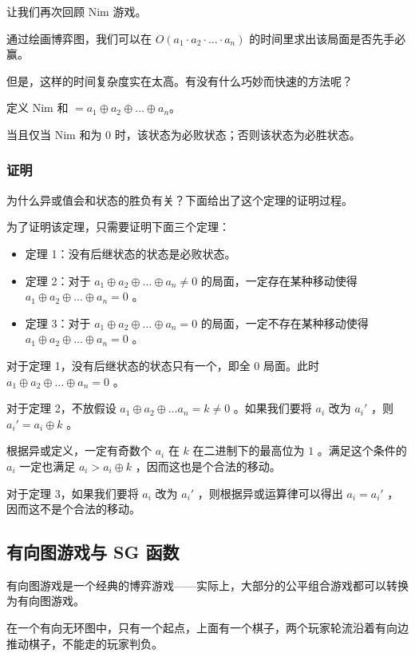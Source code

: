 让我们再次回顾 Nim 游戏。

通过绘画博弈图，我们可以在 $O(a_1 \cdot a_2 \cdot \ldots \cdot a_n)$ 的时间里求出该局面是否先手必赢。

但是，这样的时间复杂度实在太高。有没有什么巧妙而快速的方法呢？

定义 Nim 和 $=a_1 \oplus a_2 \oplus \ldots \oplus a_n$。

当且仅当 Nim 和为 $0$ 时，该状态为必败状态；否则该状态为必胜状态。

\subsubsection{证明}

为什么异或值会和状态的胜负有关？下面给出了这个定理的证明过程。

为了证明该定理，只需要证明下面三个定理：

\begin{itemize}
\item 定理 1：没有后继状态的状态是必败状态。
\item 定理 2：对于 $a_1 \oplus a_2 \oplus \ldots \oplus a_n \neq 0$ 的局面，一定存在某种移动使得 $a_1 \oplus a_2 \oplus \ldots \oplus a_n = 0$ 。
\item 定理 3：对于 $a_1 \oplus a_2 \oplus \ldots \oplus a_n = 0$ 的局面，一定不存在某种移动使得 $a_1 \oplus a_2 \oplus \ldots \oplus a_n = 0$ 。
\end{itemize}

对于定理 1，没有后继状态的状态只有一个，即全 $0$ 局面。此时 $a_1 \oplus a_2 \oplus \ldots \oplus a_n = 0$ 。

对于定理 2，不放假设 $a_1 \oplus a_2 \oplus \ldots a_n = k \neq 0$ 。如果我们要将 $a_i$ 改为 $a_i'$ ，则 $a_i'=a_i \oplus k$ 。

根据异或定义，一定有奇数个 $a_i$ 在 $k$ 在二进制下的最高位为 $1$ 。满足这个条件的 $a_i$ 一定也满足 $a_i > a_i \oplus k$ ，因而这也是个合法的移动。

对于定理 3，如果我们要将 $a_i$ 改为 $a_i'$ ，则根据异或运算律可以得出 $a_i=a_i'$ ，因而这不是个合法的移动。

\subsection{有向图游戏与 SG 函数}

有向图游戏是一个经典的博弈游戏——实际上，大部分的公平组合游戏都可以转换为有向图游戏。

在一个有向无环图中，只有一个起点，上面有一个棋子，两个玩家轮流沿着有向边推动棋子，不能走的玩家判负。

